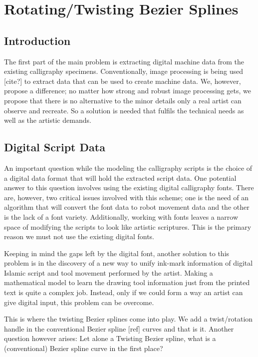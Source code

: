 \section{Rotating/Twisting Bezier Splines}\label{Chapter:Twisting Splines}

    \subsection{Introduction}
    The first part of the main problem is extracting digital machine data from the existing calligraphy specimens.  Conventionally, image processing is being used [cite?] to extract data that can be used to create machine data. We, however, propose a difference; no matter how strong and robust image processing gets, we propose that there is no alternative to the minor details only a real artist can observe and recreate. So a solution is needed that fulfils the technical needs as well as the artistic demands.
    

    \subsection{Digital Script Data}

    An important question while the modeling the calligraphy scripts is the choice of a digital data format that will hold the extracted script data. One potential answer to this question involves using the existing digital calligraphy fonts. There are, however, two critical issues involved with this scheme; one is the need of an algorithm that will convert the font data to robot movement data and the other is the lack of a font variety. Additionally, working with fonts leaves a narrow space of modifying the scripts to look like artistic scriptures. This is the primary reason we must not use the existing digital fonts.

    Keeping in mind the gaps left by the digital font, another solution to this problem is in the discovery of a new way to unify ink-mark information of digital Islamic script and tool movement performed by the artist. Making a mathematical model to learn the drawing tool information just from the printed text is quite a complex job. Instead, only if we could form a way an artist can give digital input, this problem can be overcome.

    This is where the twisting Bezier splines come into play. We add a twist/rotation handle in the conventional Bezier spline [ref] curves and that is it. Another question however arises: Let alone a Twisting Bezier spline, what is a (conventional) Bezier spline curve in the first place?


